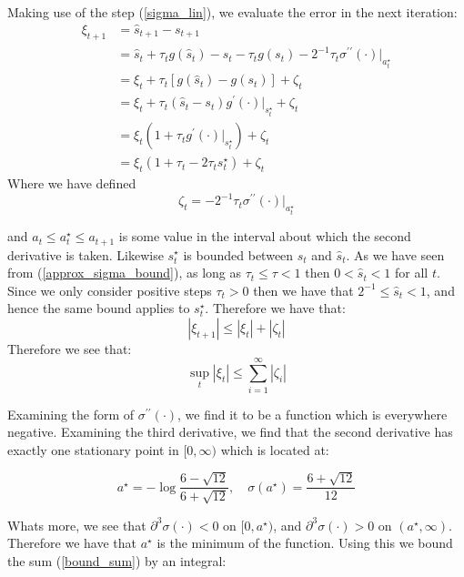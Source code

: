 \documentclass[11pt]{article}
\begin{document}
Making use of the step (\ref{sigma_lin}), we  evaluate the error in the next iteration:
\begin{align*}
\xi_{t+1} & = \hat{s}_{t+1} - s_{t+1} \\
          & = \hat{s}_t + \tau_{t}g(\hat{s}_t) -s_t -\tau_tg(s_t) - 2^{-1}\tau_t\sigma^{\prime\prime}(\cdot)|_{a^\star_t} \\
          & = \xi_t + \tau_t[g(\hat{s}_t) - g(s_t)] + \zeta_t \\
          & = \xi_t + \tau_t(\hat{s}_t-s_t)g^\prime(\cdot)|_{s^{\star}_t} + \zeta_t \\
          & = \xi_t(1+\tau_tg^\prime(\cdot)\big|_{s^{\star}_t}) + \zeta_t \\
          & = \xi_t(1+\tau_t -2\tau_ts^{\star}_t) + \zeta_t
\end{align*}
Where we have defined
\begin{equation}\label{eqn:zeta}\zeta_t = - 2^{-1}\tau_t\sigma^{\prime\prime}(\cdot)\big|_{a^\star_t} \end{equation}

\noindent and $a_t \leq a^\star_t \leq a_{t+1}$ is some value in the interval about which the second derivative is taken.  Likewise $s^\star_t$ is bounded between $s_t$ and $\hat{s}_t$.  As we have seen from (\ref{approx_sigma_bound}), as long as $\tau_t \leq \tau < 1$ then $0 < \hat{s}_t < 1$ for all $t$.  Since we only consider positive steps $\tau_t > 0$ then we have that $2^{-1} \leq \hat{s}_t < 1$, and hence the same bound applies to $s_t^\star$.  Therefore we have that:
$$|\xi_{t+1}| \leq |\xi_t| + |\zeta_t|$$
Therefore we see that:
\begin{equation}\label{bound_sum}\sup_t|\xi_t| \leq \sum_{i=1}^\infty |\zeta_i|\end{equation}

Examining the form of $\sigma^{\prime\prime}(\cdot)$, we find it to be a function which is everywhere negative.  Examining the third derivative, we find that the second derivative has exactly one stationary point in $[0,\infty)$ which is located at:

$$a^\star = -\log{\frac{6-\sqrt{12}}{6+\sqrt{12}}}, \quad \sigma(a^\star) = \frac{6+\sqrt{12}}{12} $$

Whats more, we see that $\partial^3\sigma(\cdot) < 0$ on $[0,a^\star)$, and $\partial^3\sigma(\cdot) > 0$ on $(a^\star,\infty)$.  Therefore we have that $a^\star$ is the minimum of the function.  Using this we  bound the sum (\ref{bound_sum}) by an integral:
\end{document}
